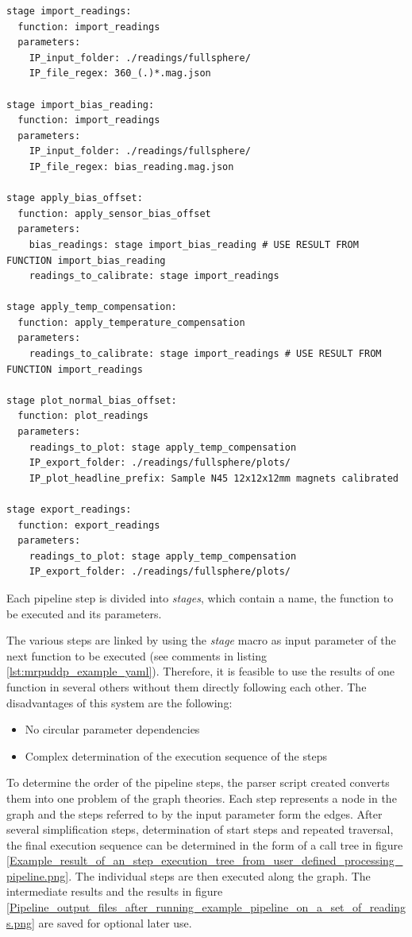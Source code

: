 \begin{lstlisting}[caption={Example YAML code of a user defined processing pipeline with six stages linked together}, label=lst:mrpuddp_example_yaml]
stage import_readings:
  function: import_readings
  parameters:
    IP_input_folder: ./readings/fullsphere/
    IP_file_regex: 360_(.)*.mag.json

stage import_bias_reading:
  function: import_readings
  parameters:
    IP_input_folder: ./readings/fullsphere/
    IP_file_regex: bias_reading.mag.json

stage apply_bias_offset:
  function: apply_sensor_bias_offset
  parameters:
    bias_readings: stage import_bias_reading # USE RESULT FROM FUNCTION import_bias_reading
    readings_to_calibrate: stage import_readings

stage apply_temp_compensation:
  function: apply_temperature_compensation
  parameters:
    readings_to_calibrate: stage import_readings # USE RESULT FROM FUNCTION import_readings

stage plot_normal_bias_offset:
  function: plot_readings
  parameters:
    readings_to_plot: stage apply_temp_compensation
    IP_export_folder: ./readings/fullsphere/plots/
    IP_plot_headline_prefix: Sample N45 12x12x12mm magnets calibrated

stage export_readings:
  function: export_readings
  parameters:
    readings_to_plot: stage apply_temp_compensation
    IP_export_folder: ./readings/fullsphere/plots/
\end{lstlisting}

\newpage

Each pipeline step is divided into \emph{stages}, which contain a name,
the function to be executed and its parameters.

The various steps are linked by using the \emph{stage } macro as input
parameter of the next function to be executed (see comments in listing
\ref{lst:mrpuddp_example_yaml}). Therefore, it is feasible to use the
results of one function in several others without them directly
following each other. The disadvantages of this system are the
following:

\begin{itemize}
\tightlist
\item
  No circular parameter dependencies
\item
  Complex determination of the execution sequence of the steps
\end{itemize}

To determine the order of the pipeline steps, the parser script created
converts them into one problem of the graph theories. Each step
represents a node in the graph and the steps referred to by the input
parameter form the edges. After several simplification steps,
determination of start steps and repeated traversal, the final execution
sequence can be determined in the form of a call tree in figure
\ref{Example_result_of_an_step_execution_tree_from_user_defined_processing_pipeline.png}.
The individual steps are then executed along the graph. The intermediate
results and the results in figure
\ref{Pipeline_output_files_after_running_example_pipeline_on_a_set_of_readings.png}
are saved for optional later use.

